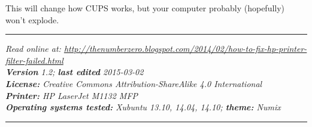 \documentclass[12pt, a4paper]{article}
\begin{document}
This will change how CUPS works, but your computer probably (hopefully) won't explode.















\vspace{4cm}
\hrule
\noindent \center \emph{Read online at: \url{http://thenumberzero.blogspot.com/2014/02/how-to-fix-hp-printer-filter-failed.html}\\
\textbf{Version} 1.2; \textbf{last edited} 2015-03-02\\
\textbf{License:} Creative Commons Attribution-ShareAlike 4.0 International\\
\textbf{Printer:} HP LaserJet M1132 MFP\\
\textbf{Operating systems tested:} Xubuntu 13.10, 14.04, 14.10; \textbf{theme:} Numix}
\vspace{1em}
\hrule
\end{document}
